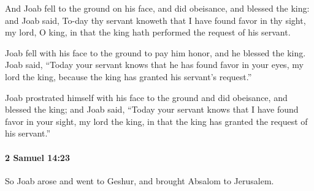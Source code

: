 			\begin{versebox}
					\item[BHS] 
					\item[ASV] And Joab fell to the ground on his face, and did obeisance, and blessed the king: and Joab said, To-day thy servant knoweth that I have found favor in thy sight, my lord, O king, in that the king hath performed the request of his servant.
					\item[NIV] Joab fell with his face to the ground to pay him honor, and he blessed the king. Joab said, “Today your servant knows that he has found favor in your eyes, my lord the king, because the king has granted his servant’s request.”
					\item[NRSV] Joab prostrated himself with his face to the ground and did obeisance, and blessed the king; and Joab said, “Today your servant knows that I have found favor in your sight, my lord the king, in that the king has granted the request of his servant.”
			\end{versebox}

		\paragraph{2 Samuel 14:23} %
			\label{2SAMUEL-14-23}

			So Joab arose and went to Geshur, and brought Absalom to Jerusalem.

